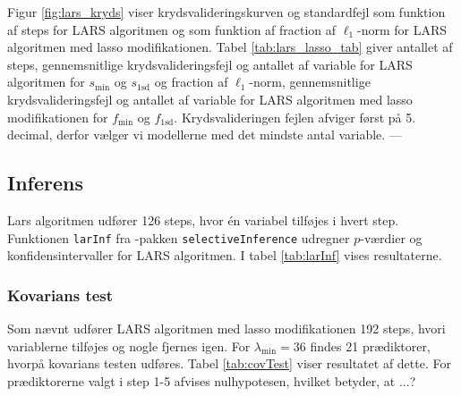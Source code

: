 Figur \ref{fig:lars_kryds} viser krydsvalideringskurven og standardfejl som funktion af steps for LARS algoritmen og som funktion af fraction af \(\ell_1\)-norm for LARS algoritmen med lasso modifikationen. 
%
Tabel \ref{tab:lars_lasso_tab} giver antallet af steps, gennemsnitlige krydsvalideringsfejl og antallet af variable for LARS algoritmen for \(s_\text{min}\) og \(s_{1 \text{sd}}\) og fraction af \(\ell_1\)-norm, gennemsnitlige krydsvalideringsfejl og antallet af variable for LARS algoritmen med lasso modifikationen for \(f_\text{min}\) og \(f_{1 \text{sd}}\).
Krydsvalideringen fejlen afviger først på 5. decimal, derfor vælger vi modellerne med det mindste antal variable. ---
%

%
%

\newpage
\subsection{Inferens}
Lars algoritmen udfører 126 steps, hvor én variabel tilføjes i hvert step.
Funktionen \texttt{larInf} fra \Rlang-pakken \texttt{selectiveInference} udregner \(p\)-værdier og konfidensintervaller for LARS algoritmen.
I tabel \ref{tab:larInf} vises resultaterne.
%

%

\subsubsection{Kovarians test}
Som nævnt udfører LARS algoritmen med lasso modifikationen 192 steps, hvori variablerne tilføjes og nogle fjernes igen.
For \(\lambda_\text{min} = 36\) findes 21 prædiktorer, hvorpå kovarians testen udføres.
Tabel \ref{tab:covTest} viser resultatet af dette.
For prædiktorerne valgt i step 1-5 afvises nulhypotesen, hvilket betyder, at ...?
%

%



%
%
%
%
%

